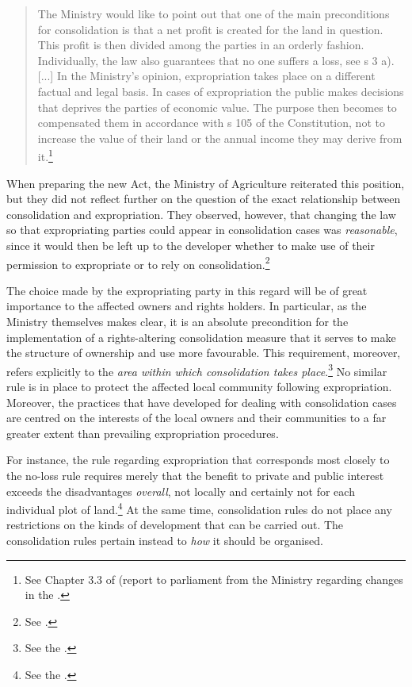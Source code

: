 \begin{quote}
The Ministry would like to point out that one of the main preconditions for consolidation is that a net profit is created for the land in question. This profit is then divided among the parties in an orderly fashion. Individually, the law also guarantees that no one suffers a loss, see s 3 a). [...] In the Ministry's opinion, expropriation takes place on a different factual and legal basis. In cases of expropriation the public makes decisions that deprives the parties of economic value. The purpose then becomes to compensated them in accordance with s 105 of the Constitution, not to increase the value of their land or the annual income they may derive from it.\footnote{See Chapter 3.3 of \cite{otprp78} (report to parliament from the Ministry regarding changes in the \cite{lca79}.}
\end{quote}

When preparing the new Act, the Ministry of Agriculture reiterated this position, but they did not reflect further on the question of the exact relationship between consolidation and expropriation. They observed, however, that changing the law so that expropriating parties could appear in consolidation cases was \emph{reasonable}, since it would then be left up to the developer whether to make use of their permission to expropriate or to rely on consolidation.\footnote{See \cite[84]{prop12}.}

The choice made by the expropriating party in this regard will be of great importance to the affected owners and rights holders. In particular, as the Ministry themselves makes clear, it is an absolute precondition for the implementation of a rights-altering consolidation measure that it serves to make the structure of ownership and use more favourable. This requirement, moreover, refers explicitly to the \emph{area within which consolidation takes place}.\footnote{See the \cite[3-3]{lca13}.} No similar rule is in place to protect the affected local community following expropriation. Moreover, the practices that have developed for dealing with consolidation cases are centred on the interests of the local owners and their communities to a far greater extent than prevailing expropriation procedures.

For instance, the rule regarding expropriation that corresponds most closely to the no-loss rule requires merely that the benefit to private and public interest exceeds the disadvantages \emph{overall}, not locally and certainly not for each individual plot of land.\footnote{See the \cite[2]{ea59}.} At the same time, consolidation rules do not place any restrictions on the kinds of development that can be carried out. The consolidation rules pertain instead to \emph{how} it should be organised. 

